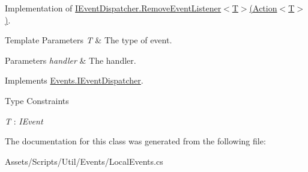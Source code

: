 Implementation of \hyperlink{interface_events_1_1_i_event_dispatcher_a86e3438c779746108c3f01dff0c43d23}{I\+Event\+Dispatcher.\+Remove\+Event\+Listener$<$\+T$>$(\+Action$<$\+T$>$)}. 


\begin{DoxyTemplParams}{Template Parameters}
{\em T} & The type of event.\\
\hline
\end{DoxyTemplParams}

\begin{DoxyParams}{Parameters}
{\em handler} & The handler.\\
\hline
\end{DoxyParams}


Implements \hyperlink{interface_events_1_1_i_event_dispatcher_a86e3438c779746108c3f01dff0c43d23}{Events.\+I\+Event\+Dispatcher}.

\begin{Desc}
\item[Type Constraints]\begin{description}
\item[{\em T} : {\em I\+Event}]\end{description}
\end{Desc}


The documentation for this class was generated from the following file\+:\begin{DoxyCompactItemize}
\item 
Assets/\+Scripts/\+Util/\+Events/Local\+Events.\+cs\end{DoxyCompactItemize}
